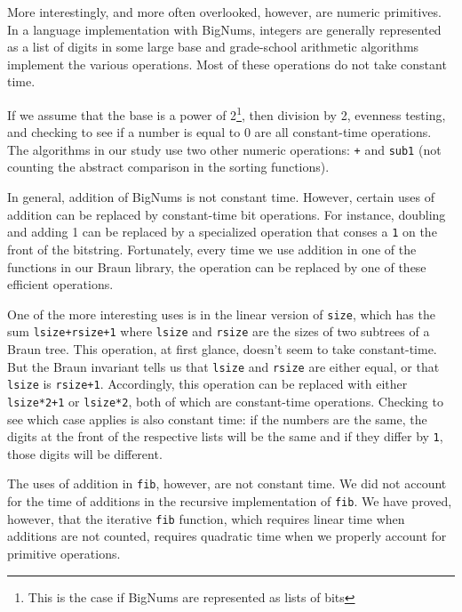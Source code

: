 \documentclass{llncs}
\newcommand{\Scribtexttt}[1]{{\texttt{#1}}}
\newcommand{\NoteBox}[1]{\footnote{#1}}
\newcommand{\NoteContent}[1]{#1}
\begin{document}
More interestingly, and more often overlooked, however, are
numeric primitives. In a language implementation with
BigNums, integers are generally represented as a list of
digits in some large base and grade{-}school arithmetic
algorithms implement the various operations.
Most of these operations do not take constant time.

If we assume that the base is a power of 2\NoteBox{\NoteContent{This is the case if BigNums are represented as lists of bits}},
then division by 2, evenness testing, and checking to see if a number is equal to 0 are all
constant{-}time operations. The algorithms in our study use two other
numeric operations: \Scribtexttt{+} and \Scribtexttt{sub1}
(not counting the abstract comparison in the sorting functions).

In general, addition of BigNums is not constant time. However, certain
uses of addition can be replaced by constant{-}time bit operations. For
instance, doubling and adding 1 can be replaced by a specialized
operation that conses a \Scribtexttt{1} on the front of the
bitstring. Fortunately, every time we use addition in one of the
functions in our Braun library, the operation can be replaced by one
of these efficient operations.

One of the more interesting uses is in the linear version of
\Scribtexttt{size}, which has the sum \Scribtexttt{lsize+rsize+1} where \Scribtexttt{lsize} and
\Scribtexttt{rsize} are the sizes of two subtrees of a Braun tree. This
operation, at first glance, doesn{'}t seem to take constant{-}time. But
the Braun invariant tells us that \Scribtexttt{lsize} and \Scribtexttt{rsize} are either
equal, or that \Scribtexttt{lsize} is \Scribtexttt{rsize+1}. Accordingly, this operation
can be replaced with either \Scribtexttt{lsize*2+1} or \Scribtexttt{lsize*2}, both of
which are constant{-}time operations. Checking to see which case applies
is also constant time: if the numbers are the same, the digits at the
front of the respective lists will be the same and if they differ by
\Scribtexttt{1}, those digits will be different.

The uses of addition in \Scribtexttt{fib}, however, are not constant time. We
did not account for the time of additions in the recursive implementation
of \Scribtexttt{fib}. We have proved, however, that the iterative \Scribtexttt{fib} function,
which requires linear time when additions are not counted, requires
quadratic time when we properly account for primitive operations.
\end{document}
